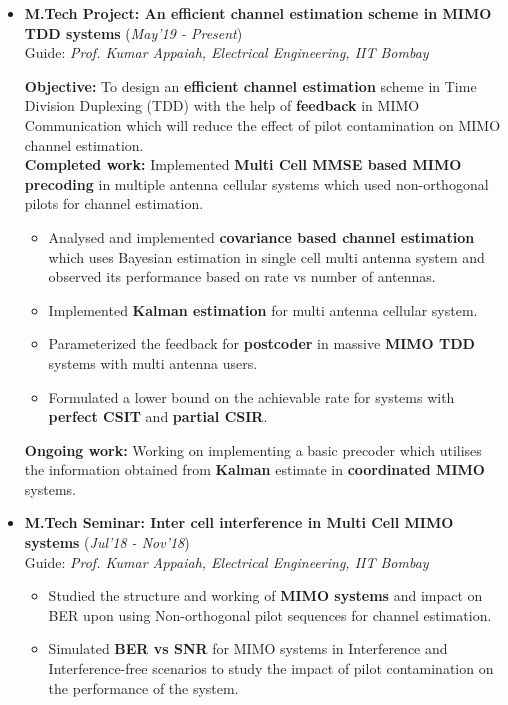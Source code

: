 \documentclass[10pt]{article}
\begin{document}
\begin{itemize}[leftmargin=0.4cm]
\item \textbf{M.Tech Project: An efficient channel estimation scheme in MIMO TDD systems}
\hfill{(\textit{May'19 - Present})} \\
Guide: \textit{Prof. Kumar Appaiah, Electrical Engineering, IIT Bombay}


  \textbf{Objective:} To design an \textbf{efficient channel estimation} scheme in Time Division Duplexing (TDD) with the help of \textbf{feedback} in MIMO Communication which will reduce the effect of pilot contamination on MIMO channel estimation.\\
%
%
\textbf{Completed work:} Implemented \textbf{Multi Cell MMSE based MIMO precoding} in multiple antenna cellular systems which used non-orthogonal pilots for channel estimation.

\begin{itemize}

\item Analysed and implemented \textbf{covariance based channel estimation} which uses Bayesian estimation in single cell multi antenna system and observed its performance based on rate vs number of antennas.

\item Implemented \textbf{Kalman estimation} for multi antenna cellular system.  

\item Parameterized the feedback for \textbf{postcoder} in massive \textbf{MIMO TDD} systems with multi antenna users. 

\item Formulated a lower bound on the achievable rate for systems with \textbf{perfect CSIT} and \textbf{partial CSIR}.

\end{itemize}


%
\textbf{Ongoing work:} Working on implementing a basic precoder which utilises the information obtained from \textbf{Kalman} estimate in \textbf{coordinated MIMO} systems.


\item \textbf{M.Tech Seminar: Inter cell interference in Multi Cell MIMO systems 
} 
\hfill{(\textit{Jul'18 - Nov'18})}\\
Guide: \textit{Prof. Kumar Appaiah, Electrical Engineering, IIT Bombay}
	\begin{itemize}
	\item Studied the structure and working of \textbf{MIMO systems} and impact on BER upon using Non-orthogonal pilot sequences for channel estimation.
	\item Simulated \textbf{BER vs SNR} for MIMO systems in Interference and Interference-free scenarios to study the impact of pilot contamination on the performance of the system.

	\end{itemize}
	

\end{itemize}
\end{document}
